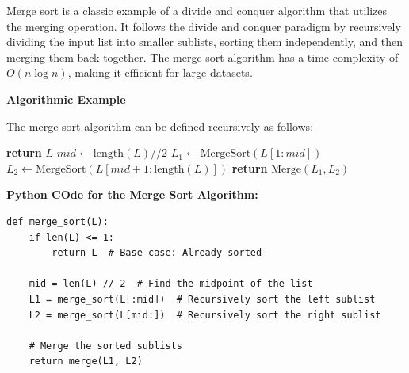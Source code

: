\documentclass[12pt]{book} %
\begin{document}
Merge sort is a classic example of a divide and conquer algorithm that utilizes the merging operation. It follows the divide and conquer paradigm by recursively dividing the input list into smaller sublists, sorting them independently, and then merging them back together. The merge sort algorithm has a time complexity of \( O(n \log n) \), making it efficient for large datasets.

\textbf{Algorithmic Example}

The merge sort algorithm can be defined recursively as follows:

\begin{algorithm}[H]
\caption{Merge Sort}
\begin{algorithmic}[1]
        \State \textbf{return} \( L \) 
    \EndIf
    \State \( mid \gets \text{length}(L) // 2 \) 
    \State \( L_1 \gets \text{MergeSort}(L[1 : mid]) \) 
    \State \( L_2 \gets \text{MergeSort}(L[mid + 1 : \text{length}(L)]) \) 
    \State \textbf{return} \( \text{Merge}(L_1, L_2) \) 
\EndProcedure
\end{algorithmic}
\end{algorithm}

\FloatBarrier
\textbf{Python COde for the Merge Sort Algorithm:}
\FloatBarrier
\begin{lstlisting}
def merge_sort(L):
    if len(L) <= 1:
        return L  # Base case: Already sorted
    
    mid = len(L) // 2  # Find the midpoint of the list
    L1 = merge_sort(L[:mid])  # Recursively sort the left sublist
    L2 = merge_sort(L[mid:])  # Recursively sort the right sublist

    # Merge the sorted sublists
    return merge(L1, L2)

\end{lstlisting}
\end{document}
